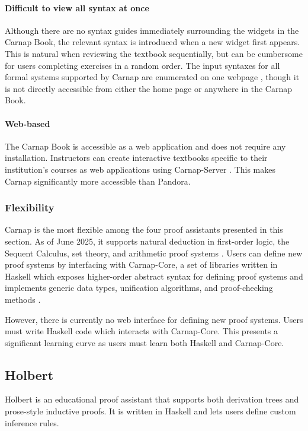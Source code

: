 \paragraph{Difficult to view all syntax at once}
Although there are no syntax guides immediately surrounding the widgets in the Carnap Book, the relevant syntax is introduced when a new widget first appears. This is natural when reviewing the textbook sequentially, but can be cumbersome for users completing exercises in a random order. The input syntaxes for all formal systems supported by Carnap are enumerated on one webpage \cite{carnap:systems}, though it is not directly accessible from either the home page or anywhere in the Carnap Book.

\paragraph{Web-based} The Carnap Book is accessible as a web application \cite{carnap:book} and does not require any installation. Instructors can create interactive textbooks specific to their institution's courses as web applications using Carnap-Server \cite{carnap:2018}. This makes Carnap significantly more accessible than Pandora.

\subsubsection{Flexibility}
Carnap is the most flexible among the four proof assistants presented in this section. As of June 2025, it supports natural deduction in first-order logic, the Sequent Calculus, set theory, and arithmetic proof systems \cite{carnap:systems}. Users can define new proof systems by interfacing with Carnap-Core, a set of libraries written in Haskell which exposes higher-order abstract syntax for defining proof systems and implements generic data types, unification algorithms, and proof-checking methods \cite{carnap:2018}.

However, there is currently no web interface for defining new proof systems. Users must write Haskell code which interacts with Carnap-Core. This presents a significant learning curve as users must learn both Haskell and Carnap-Core.

\subsection{Holbert}
Holbert \cite{oconnor:2022} is an educational proof assistant that supports both derivation trees and prose-style inductive proofs. It is written in Haskell and lets users define custom inference rules.


